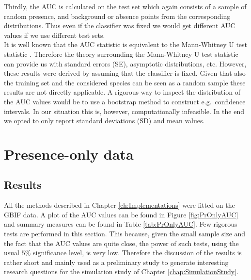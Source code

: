 Thirdly, the AUC is calculated on the test set which again consists of a sample of random presence, and background or absence points from the corresponding distributions. Thus even if the classifier was fixed we would get different AUC values if we use different test sets. \\

It is well known that the AUC statistic is equivalent to the Mann-Whitney U test statistic \parencite{hanley_meaning_1982}. Therefore the theory surrounding the Mann-Whitney U test statistic can provide us with standard errors (SE), asymptotic distributions, etc. However, these results were derived by assuming that the classifier is fixed. Given that also the training set and the considered species can be seen as a random sample these results are not directly applicable. A rigorous way to inspect the distribution of the AUC values would be to use a bootstrap method to construct e.g.\ confidence intervals. In our situation this is, however, computationally infeasible. In the end we opted to only report standard deviations (SD) and mean values.\\

\section{Presence-only data}
\label{sec:POData}
\subsection{Results}
All the methods described in Chapter \ref{ch:Implementations} were fitted on the GBIF data. A plot of the AUC values can be found in Figure \ref{fig:PrOnlyAUC} and summary measures can be found in Table \ref{tab:PrOnlyAUC}. Few rigorous tests are performed in this section. This because, given the small sample size and the fact that the AUC values are quite close, the power of such tests, using the usual $5\%$ significance level, is very low. Therefore the discussion of the results is rather short and mainly used as a preliminary study to generate interesting research questions for the simulation study of Chapter \ref{chap:SimulationStudy}. \\


